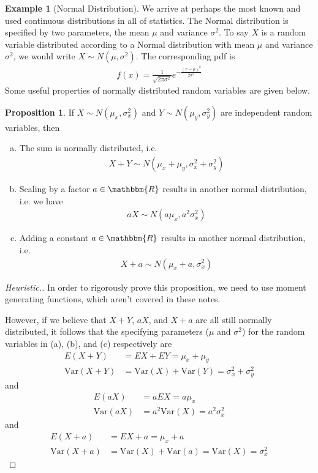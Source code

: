 \documentclass{tufte-book}
\newcommand\real{\mathbbm{R}}
\newcommand\var{\text{Var}}
\theoremstyle{definition}
\numberwithin{theorem}{section}
\numberwithin{definition}{section}
\numberwithin{lemma}{section}
\numberwithin{corollary}{section}
\newtheorem{proposition}[theorem]{Proposition}
\numberwithin{proposition}{section}
\numberwithin{remark}{section}
\numberwithin{claim}{section}
\numberwithin{observation}{section}
\numberwithin{fact}{section}
\numberwithin{assumption}{section}
\newtheorem{example}[theorem]{Example}
\numberwithin{example}{section}
\numberwithin{exercise}{section}
\begin{document}
\begin{example}[Normal Distribution]
We arrive at perhaps the most known and used continuous distributions in all of statistics. The Normal distribution is specified by two parameters, the mean $\mu$ and variance $\sigma^2$. To say $X$ is a random variable distributed according to a Normal distribution with mean $\mu$ and variance $\sigma^2$, we would write $X \sim N(\mu,\sigma^2)$. The corresponding pdf is
\begin{align*}
f(x) = \frac{1}{\sqrt{2\pi \sigma^2}} e^{-\frac{(x-\mu)^2}{2\sigma^2}}
\end{align*}
Some useful properties of normally distributed random variables are given below.
\begin{proposition}
If $X\sim N(\mu_x,\sigma^2_x)$ and $Y \sim N(\mu_{y},\sigma^2_{y})$ are independent random variables, then 
\begin{enumerate}[(a)]
\item The sum is normally distributed, i.e.
\begin{align*}
X + Y \sim N(\mu_x + \mu_y, \sigma^2_x + \sigma^2_y)
\end{align*}

\item Scaling by a factor $a \in \real$ results in another normal distribution, i.e. we have 
\begin{align*}
aX \sim N(a\mu_x, a^2\sigma^2_x)
\end{align*}

\item Adding a constant $a \in \real$ results in another normal distribution, i.e.
\begin{align*}
X + a \sim N(\mu_x + a, \sigma_x^2)
\end{align*}
\end{enumerate}
\end{proposition}

\begin{proof}[Heuristic.]
In order to rigorously prove this proposition, we need to use moment generating functions, which aren't covered in these notes. 

However, if we believe that $X + Y$, $aX$, and $X+a$ are all still normally distributed, it follows that the specifying parameters ($\mu$ and $\sigma^2$) for the random variables in (a), (b), and (c) respectively are
\begin{align*}
E(X+Y) &= EX + EY = \mu_x + \mu_y \\
\var(X+Y) &= \var(X) + \var(Y) = \sigma_x^2 + \sigma_y^2
\end{align*}
and
\begin{align*}
E(aX) &= aEX = a\mu_x \\
\var(aX) &= a^2\var(X) = a^2 \sigma_x^2
\end{align*}
and
\begin{align*}
E(X + a) &= EX + a = \mu_x + a \\
\var(X + a) &= \var(X) + \var(a) = \var(X) = \sigma_x^2
\end{align*}
\end{proof}
\end{example}
\end{document}
